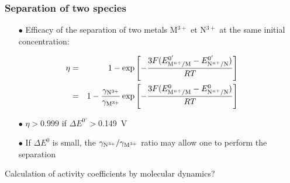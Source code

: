 \documentclass{beamer}
\begin{document}
\begin{frame}
   \frametitle{Separation of two species}
   \begin{itemize}
      \item[$\bullet$] Efficacy of the separation of two metals M$^{3+}$ et N$^{3+}$ at the same initial concentration:
   \end{itemize}
   \begin{eqnarray}
     \eta&=&1-\exp\left[-\frac{3F(E^{0'}_{{\rm M}^{n+}/{\rm M}}-E^{0'}_{{\rm N}^{n+}/{\rm N}})}{RT} \right] \nonumber \\
 &=&1-\frac{\gamma_{{\rm N}^{3+}}}{\gamma_{{\rm M}^{3+}}}\exp\left[-\frac{3F(E^0_{{\rm M}^{n+}/{\rm M}}-E^0_{{\rm N}^{n+}/{\rm N}})}{RT} \right] \nonumber
   \end{eqnarray}
   \begin{itemize}
      \item[$\bullet$] $\eta>0.999$ if $\Delta E^{0'}>$0.149~V
      \item[$\bullet$] If $\Delta E^{0}$ is small, the $\gamma_{{\rm N}^{3+}}/ \gamma_{{\rm M}^{3+}}$ ratio may allow one to perform the separation
   \end{itemize}
   \alert{Calculation of activity coefficients by molecular dynamics?}
\end{frame}
\end{document}

